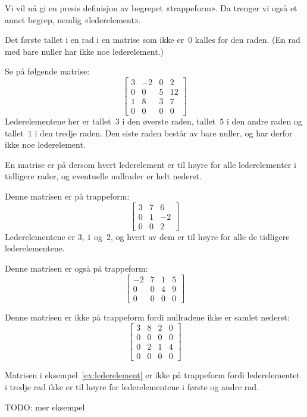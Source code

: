Vi vil nå gi en presis definisjon av begrepet «trappeform».  Da
trenger vi også et annet begrep, nemlig «lederelement».

\begin{defn}
Det første tallet i en rad i en matrise som ikke er~$0$ kalles
 for den raden.  (En rad med bare nuller har
ikke noe lederelement.)
\end{defn}

\begin{ex}
\label{ex:lederelement}
Se på følgende matrise:
\[
\begin{bmatrix}
3 & -2 & 0 & 2 \\
0 &  0  & 5 & 12 \\
1 &  8 & 3 & 7 \\
0 &  0  & 0 & 0
\end{bmatrix}
\]
Lederelementene her er tallet~$3$ i den øverste raden, tallet~$5$ i
den andre raden og tallet~$1$ i den tredje raden.  Den siste raden
består av bare nuller, og har derfor ikke noe lederelement.
\end{ex}

\begin{defn}
En matrise er på  dersom hvert lederelement er til
høyre for alle lederelementer i tidligere rader, og eventuelle
nullrader er helt nederst.
\end{defn}

\begin{ex}
\label{ex:trappeform}
Denne matrisen er på trappeform:
\[
\begin{bmatrix}
3 & 7 & 6 \\
0 & 1 & -2 \\
0 & 0 & 2
\end{bmatrix}
\]
Lederelementene er $3$, $1$ og~$2$, og hvert av dem er til høyre for
alle de tidligere lederelementene.

Denne matrisen er også på trappeform:
\[
\begin{bmatrix}
-2 & 7 & 1 & 5 \\
 0 & 0 & 4 & 9 \\
 0 & 0 & 0 & 0
\end{bmatrix}
\]

Denne matrisen er ikke på trappeform fordi nullradene ikke er samlet
nederst:
\[
\begin{bmatrix}
3 & 8 & 2 & 0 \\
0 & 0 & 0 & 0 \\
0 & 2 & 1 & 4 \\
0 & 0 & 0 & 0
\end{bmatrix}
\]

Matrisen i eksempel~\ref{ex:lederelement} er ikke på trappeform fordi
lederelementet i tredje rad ikke er til høyre for lederelementene i
første og andre rad.

TODO: mer eksempel
\end{ex}

